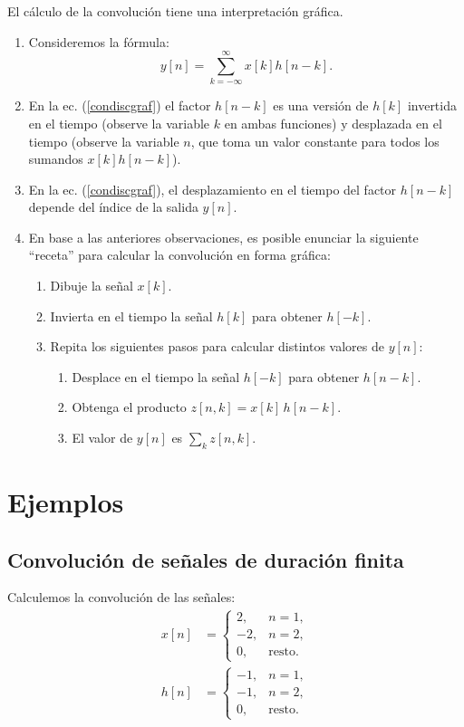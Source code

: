El cálculo de la convolución tiene una interpretación gráfica.
\begin{enumerate}
	\item Consideremos la fórmula:
	\begin{equation}
		y[n] = \sum_{k=-\infty}^{\infty} x[k] h[n-k].
		\label{condiscgraf}
	\end{equation}
	
	\item En la ec. (\ref{condiscgraf}) el factor $h[n-k]$ es una versión de $h[k]$ invertida en el tiempo (observe la variable $k$ en ambas funciones) y desplazada en el tiempo (observe la variable $n$, que toma un valor constante para todos los sumandos $x[k] h[n-k]$).
	\item En la ec. (\ref{condiscgraf}), el desplazamiento en el tiempo del factor $h[n-k]$ depende del índice de la salida $y[n]$.
	\item En base a las anteriores observaciones, es posible enunciar la siguiente ``receta'' para calcular la convolución en forma gráfica:
	\begin{enumerate}
		\item Dibuje la señal $x[k]$.
		\item Invierta en el tiempo la señal $h[k]$ para obtener $h[-k]$.
		\item Repita los siguientes pasos para calcular distintos valores de $y[n]$:
		\begin{enumerate}
			\item Desplace en el tiempo la señal $h[-k]$ para obtener $h[n-k]$.
			\item Obtenga el producto $z[n,k] = x[k] \, h[n-k]$.
			\item El valor de $y[n]$ es $\sum_{k} z[n,k]$.
		\end{enumerate}
	\end{enumerate}
\end{enumerate}

\section{Ejemplos}

\subsection{Convolución de señales de duración finita}

Calculemos la convolución de las señales:
\begin{align}
	x[n] &= \begin{cases}
		2, & n=1, \\ 
		-2, & n=2, \\ 
		0, & \text{resto}.
	\end{cases} \\ 
	h[n] &= \begin{cases}
		-1, & n=1, \\ 
		-1, & n=2, \\ 
		0, & \text{resto}.
	\end{cases}
\end{align}

